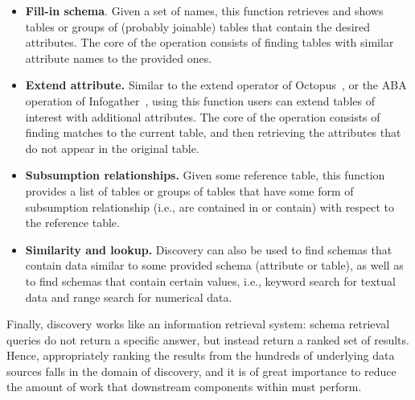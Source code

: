 \begin{itemize}
\item \textbf{Fill-in schema}. Given a set of names, this function
retrieves and shows tables or groups of (probably joinable) tables that contain
the desired attributes. The core of the operation consists of finding tables
with similar attribute names to the provided ones.

\item \textbf{Extend attribute.} Similar to the extend operator of Octopus~\cite{octopus}, or the ABA operation of Infogather~\cite{DBLP:conf/sigmod/YakoutGCC12}, using this function users
can extend tables of interest with additional attributes. The
core of the operation consists of finding matches to the current table, and then
retrieving the attributes that do not appear in the original table.

\item \textbf{Subsumption relationships.} Given some reference table,
this function provides a list of tables or groups of tables that have some form
of subsumption relationship (i.e., are contained in or contain) with respect to the reference table. 

\item \textbf{Similarity and lookup.} Discovery can also be used to find schemas
that contain data similar to some provided schema (attribute or table), as well
as to find schemas that contain certain values, i.e., keyword search for
textual data and range search for numerical data.
\end{itemize}

Finally, discovery works like an information retrieval system: schema retrieval queries
do not return a specific answer, but instead return a ranked set of results.
Hence,  appropriately ranking the results from the hundreds of underlying data
sources falls in the domain of discovery, and it is of great importance to reduce
the amount of work that downstream components  within \dcv must perform. 

